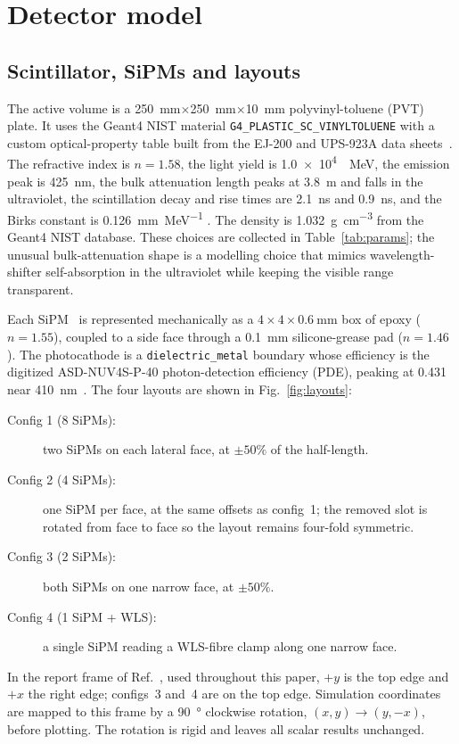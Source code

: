 \documentclass[preprint,12pt]{elsarticle}
\newcommand{\gfour}{Geant4}
\begin{document}
\section{Detector model}
\label{sec:model}

\subsection{Scintillator, SiPMs and layouts}

The active volume is a \SI{250}{\milli\meter}$\times$\SI{250}{\milli\meter}$\times$\SI{10}{\milli\meter}
polyvinyl-toluene (PVT) plate. It uses the \gfour{} NIST material
\texttt{G4\_PLASTIC\_SC\_VINYLTOLUENE} with a custom optical-property table
built from the EJ-200 and UPS-923A data
sheets~\cite{EljenEJ200,Artikov2005,AmcrysPS}. The refractive index is
$n=1.58$, the light yield is \SI{1.0e4}{\per\mega\electronvolt}, the emission
peak is \SI{425}{\nano\meter}, the bulk attenuation length peaks at
\SI{3.8}{\meter} and falls in the ultraviolet, the scintillation decay and rise
times are \SI{2.1}{\nano\second} and \SI{0.9}{\nano\second}, and the Birks
constant is \SI{0.126}{\milli\meter\per\mega\electronvolt}
\cite{Birks1951,Craun1970}. The density is \SI{1.032}{\gram\per\cubic\centi\meter}
from the \gfour{} NIST database. These choices are collected in
Table~\ref{tab:params}; the unusual bulk-attenuation shape is a modelling choice
that mimics wavelength-shifter self-absorption in the ultraviolet while keeping
the visible range transparent.

Each SiPM~\cite{Gundacker2020} is represented mechanically as a
$4\times4\times\SI{0.6}{\milli\meter}$ box of epoxy ($n=1.55$), coupled to a
side face through a \SI{0.1}{\milli\meter} silicone-grease pad ($n=1.46$). The
photocathode is a \texttt{dielectric\_metal} boundary whose efficiency is the
digitized ASD-NUV4S-P-40 photon-detection efficiency (PDE), peaking at
\num{0.431} near \SI{410}{\nano\meter}~\cite{AdvanSiD_NUV}. The four layouts are
shown in Fig.~\ref{fig:layouts}:
\begin{description}
  \item[Config 1 (8 SiPMs):] two SiPMs on each lateral face, at $\pm50\%$ of the
        half-length.
  \item[Config 2 (4 SiPMs):] one SiPM per face, at the same offsets as config~1;
        the removed slot is rotated from face to face so the layout remains
        four-fold symmetric.
  \item[Config 3 (2 SiPMs):] both SiPMs on one narrow face, at $\pm50\%$.
  \item[Config 4 (1 SiPM + WLS):] a single SiPM reading a WLS-fibre clamp along
        one narrow face.
\end{description}
In the report frame of Ref.~\cite{Rao2025}, used throughout this paper, $+y$ is
the top edge and $+x$ the right edge; configs~3 and~4 are on the top edge.
Simulation coordinates are mapped to this frame by a \SI{90}{\degree} clockwise
rotation, $(x,y)\to(y,-x)$, before plotting. The rotation is rigid and leaves
all scalar results unchanged.
\end{document}
